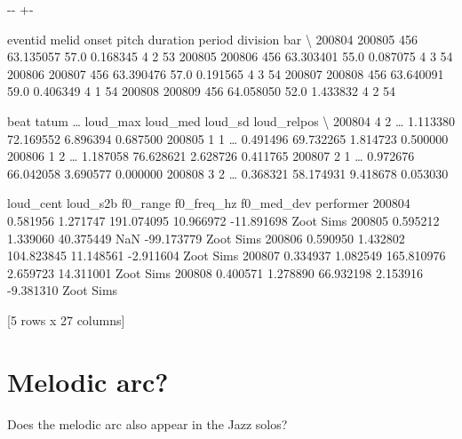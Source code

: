 \documentclass[letterpaper,10pt,english]{sphinxmanual}
\newlength\nbsphinxcodecellspacing
\begin{document}
{

\kern-\sphinxverbatimsmallskipamount\kern-\baselineskip
\kern+\FrameHeightAdjust\kern-\fboxrule
\vspace{\nbsphinxcodecellspacing}

\begin{sphinxVerbatim}[commandchars=\\\{\}]
\llap{\color{nbsphinxout}[30]:\,\hspace{\fboxrule}\hspace{\fboxsep}}        eventid  melid      onset  pitch  duration  period  division  bar  \textbackslash{}
200804   200805    456  63.135057   57.0  0.168345       4         2   53
200805   200806    456  63.303401   55.0  0.087075       4         3   54
200806   200807    456  63.390476   57.0  0.191565       4         3   54
200807   200808    456  63.640091   59.0  0.406349       4         1   54
200808   200809    456  64.058050   52.0  1.433832       4         2   54

        beat  tatum  {\ldots}  loud\_max   loud\_med   loud\_sd loud\_relpos  \textbackslash{}
200804     4      2  {\ldots}  1.113380  72.169552  6.896394    0.687500
200805     1      1  {\ldots}  0.491496  69.732265  1.814723    0.500000
200806     1      2  {\ldots}  1.187058  76.628621  2.628726    0.411765
200807     2      1  {\ldots}  0.972676  66.042058  3.690577    0.000000
200808     3      2  {\ldots}  0.368321  58.174931  9.418678    0.053030

        loud\_cent  loud\_s2b    f0\_range  f0\_freq\_hz  f0\_med\_dev  performer
200804   0.581956  1.271747  191.074095   10.966972  -11.891698  Zoot Sims
200805   0.595212  1.339060   40.375449         NaN  -99.173779  Zoot Sims
200806   0.590950  1.432802  104.823845   11.148561   -2.911604  Zoot Sims
200807   0.334937  1.082549  165.810976    2.659723   14.311001  Zoot Sims
200808   0.400571  1.278890   66.932198    2.153916   -9.381310  Zoot Sims

[5 rows x 27 columns]
\end{sphinxVerbatim}
}


\section{Melodic arc?}
\label{\detokenize{04_jazz_solos:Melodic-arc?}}
Does the melodic arc also appear in the Jazz solos?
\end{document}
